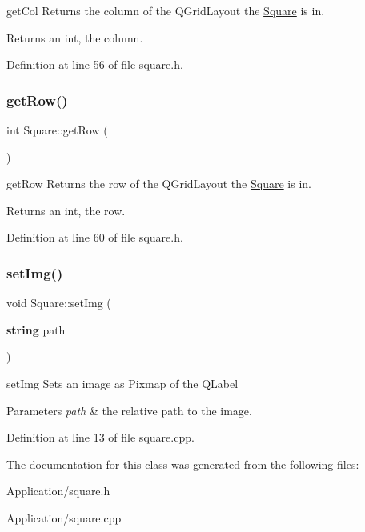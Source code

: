 get\+Col Returns the column of the Q\+Grid\+Layout the \hyperlink{class_square}{Square} is in. 

\begin{DoxyReturn}{Returns}
an int, the column. 
\end{DoxyReturn}


Definition at line 56 of file square.\+h.

\mbox{\label{class_square_ad3391313a44cdbfbe87fd3ddc545feac}} 
\subsubsection{\texorpdfstring{get\+Row()}{getRow()}}
{\footnotesize\ttfamily int Square\+::get\+Row (\begin{DoxyParamCaption}{ }\end{DoxyParamCaption})\hspace{0.3cm}{\ttfamily [inline]}}



get\+Row Returns the row of the Q\+Grid\+Layout the \hyperlink{class_square}{Square} is in. 

\begin{DoxyReturn}{Returns}
an int, the row. 
\end{DoxyReturn}


Definition at line 60 of file square.\+h.

\mbox{\label{class_square_a7a7e3e8e985f790b9a28cb4f5a6dab7a}} 
\subsubsection{\texorpdfstring{set\+Img()}{setImg()}}
{\footnotesize\ttfamily void Square\+::set\+Img (\begin{DoxyParamCaption}\item[{\textbf{ string}}]{path }\end{DoxyParamCaption})}



set\+Img Sets an image as Pixmap of the Q\+Label 


\begin{DoxyParams}{Parameters}
{\em path} & the relative path to the image. \\
\hline
\end{DoxyParams}


Definition at line 13 of file square.\+cpp.



The documentation for this class was generated from the following files\+:\begin{DoxyCompactItemize}
\item 
Application/square.\+h\item 
Application/square.\+cpp\end{DoxyCompactItemize}
